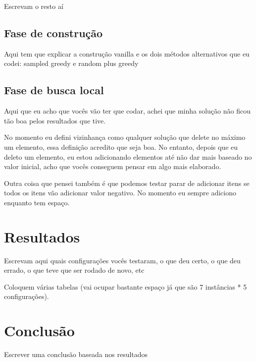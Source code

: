 \documentclass{article}
\begin{document}
Escrevam o resto aí

\subsection{Fase de construção}

Aqui tem que explicar a construção vanilla e os dois métodos alternativos que eu codei:
sampled greedy e random plus greedy

\subsection{Fase de busca local}

Aqui que eu acho que vocês vão ter que codar, achei que minha solução não ficou tão boa pelos resultados que tive.

No momento eu defini vizinhança como qualquer solução que delete no máximo um elemento, essa definição acredito que seja boa. No entanto, depois que eu deleto um elemento, eu estou adicionando elementos até não dar mais baseado no valor inicial, acho que vocês conseguem pensar em algo mais elaborado.

Outra coisa que pensei também é que podemos testar parar de adicionar itens se todos os itens vão adicionar valor negativo. No momento eu sempre adiciono enquanto tem espaço.

\section{Resultados}

Escrevam aqui quais configurações vocês testaram, o que deu certo, o que deu errado, o que teve que ser rodado de novo, etc

Coloquem várias tabelas (vai ocupar bastante espaço já que são 7 instâncias * 5 configurações).


\section{Conclusão}

Escrever uma conclusão baseada nos resultados
\end{document}
